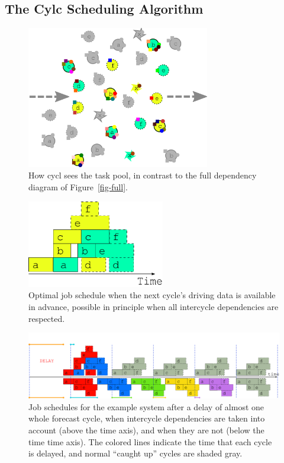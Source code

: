 \documentclass[11pt,a4paper]{article}
\begin{document}
\pagebreak
\subsection{The Cylc Scheduling Algorithm}

\begin{figure} 
    \begin{center} 
        \includegraphics[width=8cm]{inkscape-svg/task-pool}
    \end{center} 
    \caption{\small How cycl sees the task pool, in contrast to the 
    full dependency diagram of Figure~\ref{fig-full}.} 
    \label{fig-time-two}
\end{figure} 

\begin{figure}
    \begin{center}
        \includegraphics[width=6cm]{inkscape-svg/timeline-two-cycles-optimal} 
    \end{center}
    \caption{\small Optimal job schedule when the next cycle's driving
    data is available in advance, possible in principle when all
    intercycle dependencies are respected.} 
    \label{fig-optimal-two}
\end{figure} 

\begin{figure}
    \begin{center}
        \includegraphics[width=12cm]{inkscape-svg/timeline-three} 
    \end{center}
    \caption{\small Job schedules for the example system after a delay
    of almost one whole forecast cycle, when intercycle dependencies are
    taken into account (above the time axis), and when they are not
    (below the time time axis). The colored lines indicate the time that
    each cycle is delayed, and normal ``caught up'' cycles
    are shaded gray.} 
    \label{fig-time-three}
\end{figure} 
\end{document}
